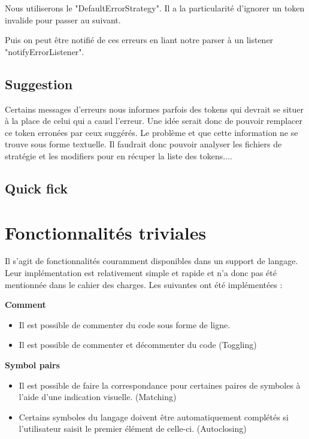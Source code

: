 \documentclass[
    iict, %
    il, %
]{heig-tb}
\begin{document}
Nous utiliserons le "DefaultErrorStrategy". Il a la particularité d'ignorer un token invalide pour passer au suivant.

Puis on peut être notifié de ces erreurs en liant notre parser à un listener "notifyErrorListener".




\subsection{Suggestion}
Certains messages d'erreurs nous informes parfois des tokens qui devrait se situer à la place de celui qui a causl l'erreur.
Une idée serait donc de pouvoir remplacer ce token erronées par ceux suggérés.
Le problème et que cette information ne se trouve sous forme textuelle.
Il faudrait donc pouvoir analyser les fichiers de stratégie et les modifiers pour en récuper la liste des tokens....


\subsection{Quick fick}

\section{Fonctionnalités triviales}
Il s'agit de fonctionnalités couramment disponibles dans un support de langage. Leur implémentation est relativement simple et rapide et n'a donc pas été mentionnée dans le cahier des charges.
Les suivantes ont été implémentées :

\textbf{Comment}
\begin{itemize}
    \item Il est possible de commenter du code sous forme de ligne.
    \item Il est possible de commenter et décommenter du code (Toggling)
\end{itemize}

\textbf{Symbol pairs}
\begin{itemize}
    \item Il est possible de faire la correspondance pour certaines paires de symboles à l'aide d'une indication visuelle. (Matching)
    \item Certains symboles du langage doivent être automatiquement complétés si l'utilisateur saisit le premier élément de celle-ci. (Autoclosing)
\end{itemize}
\end{document}
